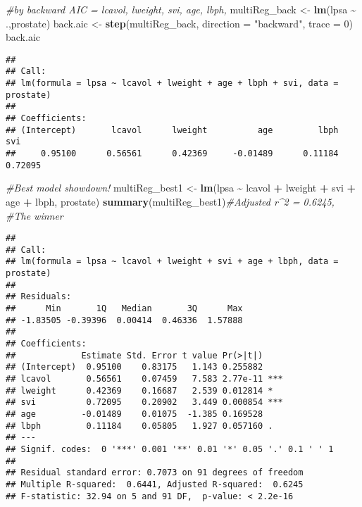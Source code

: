 \documentclass[
]{article}
\newenvironment{Shaded}{\begin{snugshade}}{\end{snugshade}}
\newcommand{\AttributeTok}[1]{\textcolor[rgb]{0.13,0.29,0.53}{#1}}
\newcommand{\CommentTok}[1]{\textcolor[rgb]{0.56,0.35,0.01}{\textit{#1}}}
\newcommand{\DecValTok}[1]{\textcolor[rgb]{0.00,0.00,0.81}{#1}}
\newcommand{\FunctionTok}[1]{\textcolor[rgb]{0.13,0.29,0.53}{\textbf{#1}}}
\newcommand{\NormalTok}[1]{#1}
\newcommand{\OtherTok}[1]{\textcolor[rgb]{0.56,0.35,0.01}{#1}}
\newcommand{\SpecialCharTok}[1]{\textcolor[rgb]{0.81,0.36,0.00}{\textbf{#1}}}
\newcommand{\StringTok}[1]{\textcolor[rgb]{0.31,0.60,0.02}{#1}}
\begin{document}
\begin{Shaded}
\begin{Highlighting}[]
  \CommentTok{\#by backward AIC = lcavol, lweight, svi, age, lbph,}
\NormalTok{    multiReg\_back }\OtherTok{\textless{}{-}} \FunctionTok{lm}\NormalTok{(lpsa }\SpecialCharTok{\textasciitilde{}}\NormalTok{ .,prostate)}
\NormalTok{    back.aic }\OtherTok{\textless{}{-}} \FunctionTok{step}\NormalTok{(multiReg\_back, }\AttributeTok{direction =} \StringTok{"backward"}\NormalTok{, }\AttributeTok{trace =} \DecValTok{0}\NormalTok{)}
\NormalTok{    back.aic}
\end{Highlighting}
\end{Shaded}

\begin{verbatim}
## 
## Call:
## lm(formula = lpsa ~ lcavol + lweight + age + lbph + svi, data = prostate)
## 
## Coefficients:
## (Intercept)       lcavol      lweight          age         lbph          svi  
##     0.95100      0.56561      0.42369     -0.01489      0.11184      0.72095
\end{verbatim}

\begin{Shaded}
\begin{Highlighting}[]
\CommentTok{\#Best model showdown!}
\NormalTok{multiReg\_best1 }\OtherTok{\textless{}{-}} \FunctionTok{lm}\NormalTok{(lpsa }\SpecialCharTok{\textasciitilde{}}\NormalTok{ lcavol }\SpecialCharTok{+}\NormalTok{ lweight }\SpecialCharTok{+}\NormalTok{ svi }\SpecialCharTok{+}\NormalTok{ age }\SpecialCharTok{+}\NormalTok{ lbph, prostate)}
\FunctionTok{summary}\NormalTok{(multiReg\_best1)}\CommentTok{\#Adjusted r\^{}2 = 0.6245, \#The winner}
\end{Highlighting}
\end{Shaded}

\begin{verbatim}
## 
## Call:
## lm(formula = lpsa ~ lcavol + lweight + svi + age + lbph, data = prostate)
## 
## Residuals:
##      Min       1Q   Median       3Q      Max 
## -1.83505 -0.39396  0.00414  0.46336  1.57888 
## 
## Coefficients:
##             Estimate Std. Error t value Pr(>|t|)    
## (Intercept)  0.95100    0.83175   1.143 0.255882    
## lcavol       0.56561    0.07459   7.583 2.77e-11 ***
## lweight      0.42369    0.16687   2.539 0.012814 *  
## svi          0.72095    0.20902   3.449 0.000854 ***
## age         -0.01489    0.01075  -1.385 0.169528    
## lbph         0.11184    0.05805   1.927 0.057160 .  
## ---
## Signif. codes:  0 '***' 0.001 '**' 0.01 '*' 0.05 '.' 0.1 ' ' 1
## 
## Residual standard error: 0.7073 on 91 degrees of freedom
## Multiple R-squared:  0.6441, Adjusted R-squared:  0.6245 
## F-statistic: 32.94 on 5 and 91 DF,  p-value: < 2.2e-16
\end{verbatim}
\end{document}
